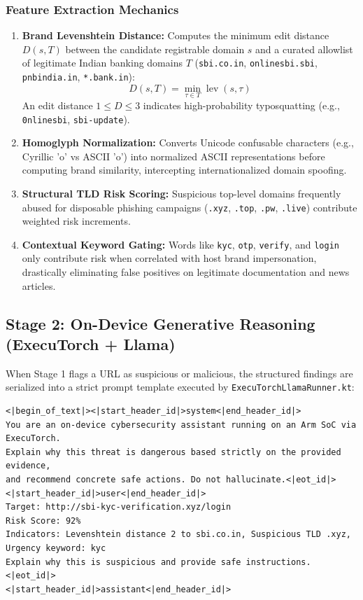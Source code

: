 \documentclass[11pt,a4paper]{article}
\begin{document}
\subsubsection{Feature Extraction Mechanics}
\begin{enumerate}
    \item \textbf{Brand Levenshtein Distance:} Computes the minimum edit distance $D(s, T)$ between the candidate registrable domain $s$ and a curated allowlist of legitimate Indian banking domains $T$ (\texttt{sbi.co.in}, \texttt{onlinesbi.sbi}, \texttt{pnbindia.in}, \texttt{*.bank.in}):
    \begin{equation}
        D(s, T) = \min_{\tau \in T} \operatorname{lev}(s, \tau)
    \end{equation}
    An edit distance $1 \le D \le 3$ indicates high-probability typosquatting (e.g., \texttt{0nlinesbi}, \texttt{sbi-update}).
    \item \textbf{Homoglyph Normalization:} Converts Unicode confusable characters (e.g., Cyrillic 'o' vs ASCII 'o') into normalized ASCII representations before computing brand similarity, intercepting internationalized domain spoofing.
    \item \textbf{Structural TLD Risk Scoring:} Suspicious top-level domains frequently abused for disposable phishing campaigns (\texttt{.xyz}, \texttt{.top}, \texttt{.pw}, \texttt{.live}) contribute weighted risk increments.
    \item \textbf{Contextual Keyword Gating:} Words like \texttt{kyc}, \texttt{otp}, \texttt{verify}, and \texttt{login} only contribute risk when correlated with host brand impersonation, drastically eliminating false positives on legitimate documentation and news articles.
\end{enumerate}

\subsection{Stage 2: On-Device Generative Reasoning (ExecuTorch + Llama)}
When Stage 1 flags a URL as suspicious or malicious, the structured findings are serialized into a strict prompt template executed by \texttt{ExecuTorchLlamaRunner.kt}:

\begin{lstlisting}
<|begin_of_text|><|start_header_id|>system<|end_header_id|>
You are an on-device cybersecurity assistant running on an Arm SoC via ExecuTorch.
Explain why this threat is dangerous based strictly on the provided evidence,
and recommend concrete safe actions. Do not hallucinate.<|eot_id|>
<|start_header_id|>user<|end_header_id|>
Target: http://sbi-kyc-verification.xyz/login
Risk Score: 92%
Indicators: Levenshtein distance 2 to sbi.co.in, Suspicious TLD .xyz, Urgency keyword: kyc
Explain why this is suspicious and provide safe instructions.<|eot_id|>
<|start_header_id|>assistant<|end_header_id|>
\end{lstlisting}
\end{document}
